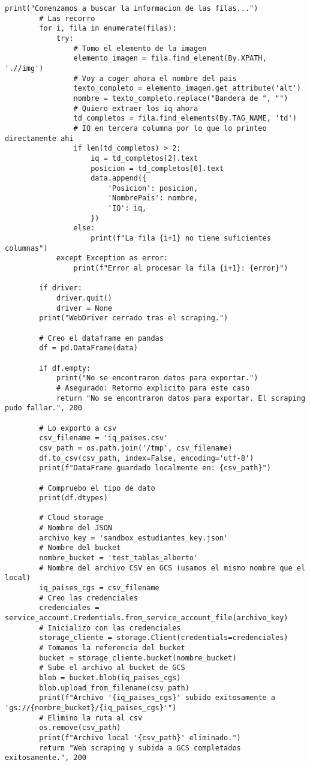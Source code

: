 \begin{lstlisting}[caption = {Código de web scrapping completo.}, label = WBSCode]
        print("Comenzamos a buscar la informacion de las filas...")
        # Las recorro
        for i, fila in enumerate(filas):
            try:
                # Tomo el elemento de la imagen
                elemento_imagen = fila.find_element(By.XPATH, './/img')
                # Voy a coger ahora el nombre del pais
                texto_completo = elemento_imagen.get_attribute('alt')
                nombre = texto_completo.replace("Bandera de ", "")
                # Quiero extraer los iq ahora
                td_completos = fila.find_elements(By.TAG_NAME, 'td')
                # IQ en tercera columna por lo que lo printeo directamente ahi
                if len(td_completos) > 2:
                    iq = td_completos[2].text
                    posicion = td_completos[0].text
                    data.append({
                        'Posicion': posicion,
                        'NombrePais': nombre,
                        'IQ': iq,
                    })
                else:
                    print(f"La fila {i+1} no tiene suficientes columnas")
            except Exception as error:
                print(f"Error al procesar la fila {i+1}: {error}")

        if driver:
            driver.quit()
            driver = None
        print("WebDriver cerrado tras el scraping.")
        
        # Creo el dataframe en pandas
        df = pd.DataFrame(data)
        
        if df.empty:
            print("No se encontraron datos para exportar.")
            # Asegurado: Retorno explicito para este caso
            return "No se encontraron datos para exportar. El scraping pudo fallar.", 200
        
        # Lo exporto a csv
        csv_filename = 'iq_paises.csv'
        csv_path = os.path.join('/tmp', csv_filename)
        df.to_csv(csv_path, index=False, encoding='utf-8')
        print(f"DataFrame guardado localmente en: {csv_path}")
        
        # Compruebo el tipo de dato
        print(df.dtypes)
    
        # Cloud storage
        # Nombre del JSON
        archivo_key = 'sandbox_estudiantes_key.json'
        # Nombre del bucket
        nombre_bucket = 'test_tablas_alberto'
        # Nombre del archivo CSV en GCS (usamos el mismo nombre que el local)
        iq_paises_cgs = csv_filename 
        # Creo las credenciales
        credenciales = service_account.Credentials.from_service_account_file(archivo_key)
        # Inicializo con las credenciales
        storage_cliente = storage.Client(credentials=credenciales)
        # Tomamos la referencia del bucket
        bucket = storage_cliente.bucket(nombre_bucket)
        # Sube el archivo al bucket de GCS
        blob = bucket.blob(iq_paises_cgs)
        blob.upload_from_filename(csv_path)
        print(f"Archivo '{iq_paises_cgs}' subido exitosamente a 'gs://{nombre_bucket}/{iq_paises_cgs}'")
        # Elimino la ruta al csv
        os.remove(csv_path)
        print(f"Archivo local '{csv_path}' eliminado.")
        return "Web scraping y subida a GCS completados exitosamente.", 200


\end{lstlisting}
